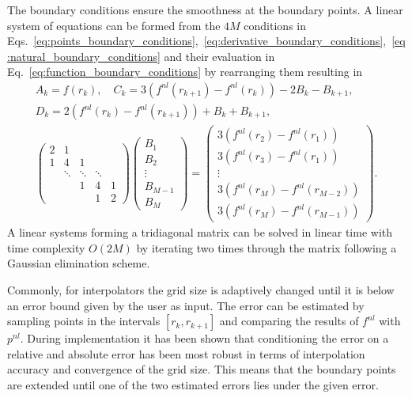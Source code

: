The boundary conditions ensure the smoothness at the boundary points.
A linear system of equations can be formed from the $4M$ conditions in Eqs.~\ref{eq:points_boundary_conditions},~\ref{eq:derivative_boundary_conditions},~\ref{eq:natural_boundary_conditions} and their evaluation in Eq.~\ref{eq:function_boundary_conditions} by rearranging them\cite{bartels1995introduction} resulting in
\begin{subequations}
\begin{align}
A_k = f(r_k),\quad C_k = 3(f^{nl}(r_{k+1})-f^{nl}(r_k)) - 2B_k-B_{k+1},\\
D_k = 2(f^{nl}(r_{k})-f^{nl}(r_{k+1})) + B_k+B_{k+1},\hspace{5em}\\
\begin{pmatrix}
    2 & 1       &           &       &    \\
    1 & 4       & 1         &           &    \\
      & \ddots  & \ddots    & \ddots    &           \\
      &         & 1         &     4     & 1   \\
      &         &           &     1     & 2
\end{pmatrix}
\begin{pmatrix}
B_1\\
B_2\\
\vdots\\
B_{M-1}\\
B_{M}
\end{pmatrix}
=
\begin{pmatrix}
3(f^{nl}(r_2)-f^{nl}(r_1))\\
3(f^{nl}(r_3)-f^{nl}(r_1))\\
\vdots\\
3(f^{nl}(r_M)-f^{nl}(r_{M-2}))\\
3(f^{nl}(r_M)-f^{nl}(r_{M-1}))
\end{pmatrix}.
\end{align}
\end{subequations}
A linear systems forming a tridiagonal matrix can be solved in linear time with time complexity $O(2M)$ by iterating two times through the matrix following a Gaussian elimination scheme.
%    

Commonly, for interpolators the grid size is adaptively changed until it is below an error bound given by the user as input.
The error can be estimated by sampling points in the intervals $[r_k,r_{k+1}]$ and comparing the results of $f^{nl}$ with $p^{nl}$.
During implementation it has been shown that conditioning the error on a relative and absolute error has been most robust in terms of interpolation accuracy and convergence of the grid size.
This means that the boundary points are extended until one of the two estimated errors lies under the given error.

